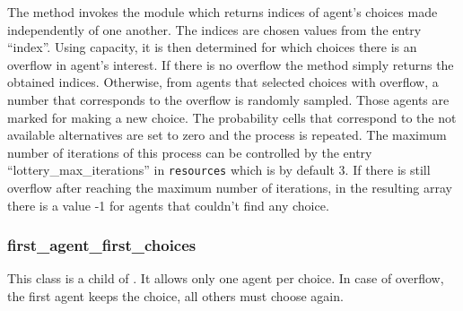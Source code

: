 The  method invokes the  module
 which returns indices of agent's
choices made independently of one another.  The indices are chosen
values from the entry ``index''. Using capacity, it is then
determined for which choices there is an overflow in agent's
interest. If there is no overflow the method simply returns the
obtained indices. Otherwise, from agents that selected choices with
overflow, a number that corresponds to the overflow is randomly
sampled. Those agents are marked for making a new choice.  The
probability cells that correspond to the not available alternatives
are set to zero and the process is repeated.  The maximum number of
iterations of this process can be controlled by the entry
``lottery_max_iterations'' in \verb|resources| which is by default
3. If there is still overflow after reaching the maximum number of
iterations, in the resulting array there is a value -1 for agents
that couldn't find any choice.


\subsubsection{first_agent_first_choices}
%
This class is a child of . It allows only one agent per
choice. In case of overflow, the first agent keeps the choice, all others must
choose again.


